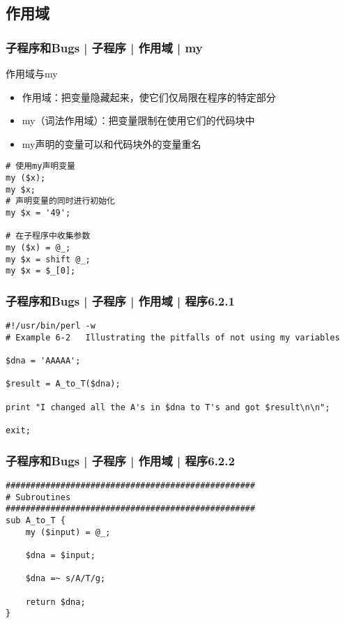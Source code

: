 \subsection{作用域}
\begin{frame}[fragile]
  \frametitle{子程序和Bugs | 子程序 | 作用域 | \alert{my}}
  \begin{block}{作用域与my}
    \begin{itemize}
      \item 作用域：把变量隐藏起来，使它们仅局限在程序的特定部分
      \item my（词法作用域）：把变量限制在使用它们的代码块中
      \item my声明的变量可以和代码块外的变量重名
    \end{itemize}
  \end{block}
  \pause
  \vspace{-0.5em}
\begin{lstlisting}
# 使用my声明变量
my ($x);
my $x;
# 声明变量的同时进行初始化
my $x = '49';

# 在子程序中收集参数
my ($x) = @_;
my $x = shift @_;
my $x = $_[0];
\end{lstlisting}
\end{frame}

\begin{frame}[fragile]
  \frametitle{子程序和Bugs | 子程序 | 作用域 | 程序6.2.1}
\begin{lstlisting}[firstnumber=1]
#!/usr/bin/perl -w
# Example 6-2   Illustrating the pitfalls of not using my variables

$dna = 'AAAAA';

$result = A_to_T($dna);

print "I changed all the A's in $dna to T's and got $result\n\n";

exit;
\end{lstlisting}
\end{frame}

\begin{frame}[fragile]
  \frametitle{子程序和Bugs | 子程序 | 作用域 | 程序6.2.2}
\begin{lstlisting}[firstnumber=12,basicstyle=\small\tt]
##################################################
# Subroutines
##################################################
sub A_to_T {
    my ($input) = @_;

    $dna = $input;

    $dna =~ s/A/T/g;

    return $dna;
}
\end{lstlisting}
\end{frame}


